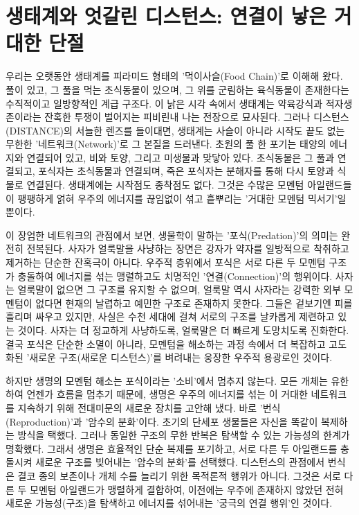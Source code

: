 

\section{생태계와 엇갈린 디스턴스: 연결이 낳은 거대한 단절}
우리는 오랫동안 생태계를 피라미드 형태의 '먹이사슬(Food Chain)'로 이해해 왔다. 풀이 있고, 그 풀을 먹는 초식동물이 있으며, 그 위를 군림하는 육식동물이 존재한다는 수직적이고 일방향적인 계급 구조다. 이 낡은 시각 속에서 생태계는 약육강식과 적자생존이라는 잔혹한 투쟁이 벌어지는 피비린내 나는 전장으로 묘사된다.
그러나 디스턴스(DISTANCE)의 서늘한 렌즈를 들이대면, 생태계는 사슬이 아니라 시작도 끝도 없는 무한한 '네트워크(Network)'로 그 본질을 드러낸다. 초원의 풀 한 포기는 태양의 에너지와 연결되어 있고, 비와 토양, 그리고 미생물과 맞닿아 있다. 초식동물은 그 풀과 연결되고, 포식자는 초식동물과 연결되며, 죽은 포식자는 분해자를 통해 다시 토양과 식물로 연결된다. 생태계에는 시작점도 종착점도 없다. 그것은 수많은 모멘텀 아일랜드들이 팽팽하게 얽혀 우주의 에너지를 끊임없이 섞고 흩뿌리는 '거대한 모멘텀 믹서기'일 뿐이다.

이 장엄한 네트워크의 관점에서 보면, 생물학이 말하는 '포식(Predation)'의 의미는 완전히 전복된다. 사자가 얼룩말을 사냥하는 장면은 강자가 약자를 일방적으로 착취하고 제거하는 단순한 잔혹극이 아니다. 우주적 층위에서 포식은 서로 다른 두 모멘텀 구조가 충돌하여 에너지를 섞는 맹렬하고도 치명적인 '연결(Connection)'의 행위이다.
사자는 얼룩말이 없으면 그 구조를 유지할 수 없으며, 얼룩말 역시 사자라는 강력한 외부 모멘텀이 없다면 현재의 날렵하고 예민한 구조로 존재하지 못한다. 그들은 겉보기엔 피를 흘리며 싸우고 있지만, 사실은 수천 세대에 걸쳐 서로의 구조를 날카롭게 제련하고 있는 것이다. 사자는 더 정교하게 사냥하도록, 얼룩말은 더 빠르게 도망치도록 진화한다. 결국 포식은 단순한 소멸이 아니라, 모멘텀을 해소하는 과정 속에서 더 복잡하고 고도화된 '새로운 구조(새로운 디스턴스)'를 벼려내는 웅장한 우주적 용광로인 것이다.

하지만 생명의 모멘텀 해소는 포식이라는 '소비'에서 멈추지 않는다. 모든 개체는 유한하여 언젠가 흐름을 멈추기 때문에, 생명은 우주의 에너지를 섞는 이 거대한 네트워크를 지속하기 위해 전대미문의 새로운 장치를 고안해 냈다. 바로 '번식(Reproduction)'과 '암수의 분화'이다.
초기의 단세포 생물들은 자신을 똑같이 복제하는 방식을 택했다. 그러나 동일한 구조의 무한 반복은 탐색할 수 있는 가능성의 한계가 명확했다. 그래서 생명은 효율적인 단순 복제를 포기하고, 서로 다른 두 아일랜드를 충돌시켜 새로운 구조를 빚어내는 '암수의 분화'를 선택했다. 디스턴스의 관점에서 번식은 결코 종의 보존이나 개체 수를 늘리기 위한 목적론적 행위가 아니다. 그것은 서로 다른 두 모멘텀 아일랜드가 맹렬하게 결합하여, 이전에는 우주에 존재하지 않았던 전혀 새로운 가능성(구조)을 탐색하고 에너지를 섞어내는 '궁극의 연결 행위'인 것이다.

